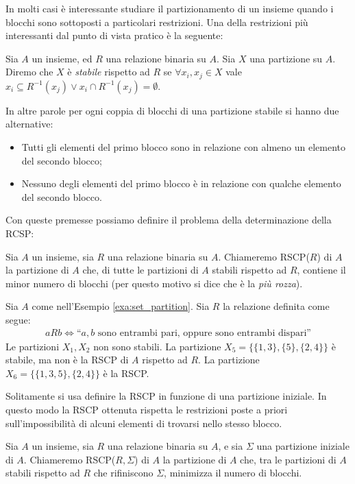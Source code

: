 In molti casi è interessante studiare il partizionamento di un insieme quando i blocchi sono sottoposti a particolari restrizioni. Una della restrizioni più
interessanti dal punto di vista pratico è la seguente:
\begin{definition}
    Sia $A$ un insieme, ed $R$ una relazione binaria su $A$. Sia $X$ una partizione su $A$. Diremo che $X$ è \emph{stabile} rispetto ad $R$ se $\forall x_i, x_j \in X$
    vale $x_i \subseteq R^{-1}(x_j) \lor x_i \cap R^{-1}(x_j) = \emptyset$.
\end{definition}
In altre parole per ogni coppia di blocchi di una partizione stabile si hanno due alternative:
\begin{itemize}
    \item Tutti gli elementi del primo blocco sono in relazione con almeno un elemento del secondo blocco;
    \item Nessuno degli elementi del primo blocco è in relazione con qualche elemento del secondo blocco.
\end{itemize}
Con queste premesse possiamo definire il problema della determinazione della RCSP:
\begin{definition}
    Sia $A$ un insieme, sia $R$ una relazione binaria su $A$. Chiameremo RSCP($R$) di $A$ la partizione di $A$ che, di tutte le partizioni di $A$ stabili rispetto ad $R$, contiene il minor numero di blocchi (per questo motivo si dice che è la \emph{più rozza}).
\end{definition}
\begin{example}
    Sia $A$ come nell'Esempio \ref*{exa:set_partition}. Sia $R$ la relazione definita come segue:
    \begin{gather*}
        a R b \iff \text{``} a,b \text{ sono entrambi pari, oppure sono entrambi dispari''}
    \end{gather*}
    Le partizioni $X_1,X_2$ non sono stabili. La partizione $X_5 = \{\{1,3\},\{5\},\{2,4\}\}$ è stabile, ma non è la RSCP di $A$ rispetto ad $R$. La partizione
    $X_6 = \{\{1,3,5\},\{2,4\}\}$ è la RSCP.
\end{example}
Solitamente si usa definire la RSCP in funzione di una partizione iniziale. In questo modo la RSCP ottenuta rispetta le restrizioni poste a priori sull'impossibilità di alcuni elementi di trovarsi nello stesso blocco.
\begin{definition}
    Sia $A$ un insieme, sia $R$ una relazione binaria su $A$, e sia $\Sigma$ una partizione iniziale di $A$. Chiameremo RSCP($R,\Sigma$) di $A$ la partizione di $A$ che, tra le partizioni di $A$ stabili rispetto ad $R$ che rifiniscono $\Sigma$,
    minimizza il numero di blocchi.
\end{definition}


